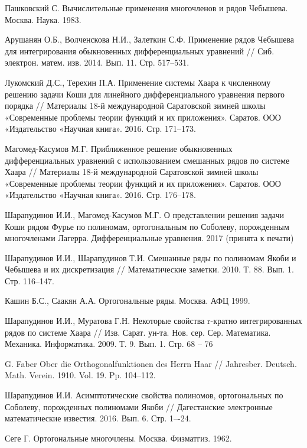 \begin{thebibliography}{1}
{Пашковский С.}
Вычислительные применения многочленов и рядов Чебышева. Москва. Наука. 1983.

{Арушанян О.Б., Волченскова Н.И., Залеткин С.Ф.}
Применение рядов Чебышева для интегрирования обыкновенных дифференциальных уравнений // Сиб. электрон. матем. изв. 2014. Вып. 11. Стр. 517--531.

{Лукомский Д.С., Терехин П.А.}
Применение системы Хаара к численному решению задачи Коши для линейного дифференциального уравнения первого порядка // Материалы 18-й международной Саратовской зимней школы «Современные проблемы теории функций и их приложения». Саратов. ООО «Издательство «Научная книга». 2016. Стр. 171--173.

{Магомед-Касумов М.Г.}
Приближенное решение обыкновенных дифференциальных уравнений с использованием смешанных рядов по системе Хаара // Материалы 18-й международной Саратовской зимней школы «Современные проблемы теории функций и их приложения». Саратов. ООО «Издательство «Научная книга». 2016. Стр. 176--178.

{Шарапудинов И.И., Магомед-Касумов М.Г.}
О представлении решения задачи Коши  рядом Фурье  по полиномам, ортогональным по  Соболеву, порожденным многочленами Лагерра. Дифференциальные уравнения. 2017 (принята к печати)

{Шарапудинов И.И., Шарапудинов Т.И.}
Смешанные ряды по полиномам Якоби и Чебышева и их дискретизация // Математические заметки. 2010. Т. 88. Вып. 1. Стр. 116--147.

{Кашин Б.С., Саакян А.А.}
Ортогональные ряды. Москва. АФЦ 1999.

{Шарапудинов И.И., Муратова Г.Н.}
Некоторые свойства r-кратно интегрированных рядов по системе Хаара // Изв. Сарат. ун-та. Нов. сер. Сер. Математика. Механика. Информатика. 2009. Т. 9. Вып. 1. Стр. 68 -- 76

{G. Faber}
Ober die Orthogonalfunktionen des Herrn Haar // Jahresber. Deutsch. Math. Verein. 1910. Vol. 19. Pp. 104--112.

{Шарапудинов И.И.}
Асимптотические свойства полиномов, ортогональных по Соболеву, порожденных полиномами Якоби // Дагестанские электронные математические известия. 2016. Вып. 6.	Стр. 1–-24.

{Сеге Г.}
Ортогональные многочлены. Москва. Физматгиз. 1962.


\end{thebibliography}
